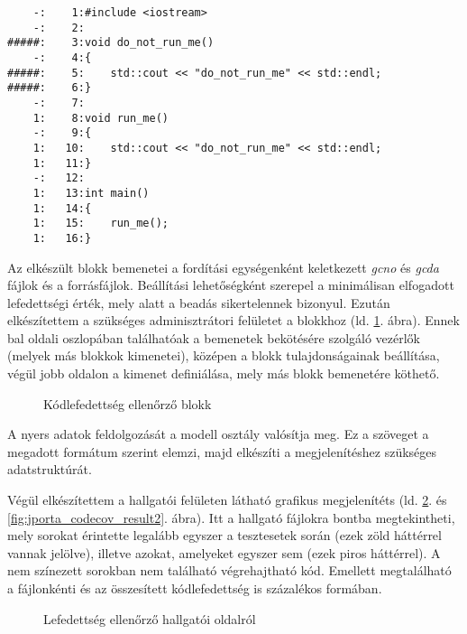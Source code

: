 \begin{lstlisting}
    -:    1:#include <iostream>
    -:    2:
#####:    3:void do_not_run_me()
    -:    4:{
#####:    5:    std::cout << "do_not_run_me" << std::endl;
#####:    6:}
    -:    7:
    1:    8:void run_me()
    -:    9:{	 
    1:   10:    std::cout << "do_not_run_me" << std::endl;
    1:   11:}
    -:   12:	 
    1:   13:int main()	 
    1:   14:{	 
    1:   15:    run_me();
    1:   16:}
\end{lstlisting}

Az elkészült blokk bemenetei a fordítási egységenként keletkezett \textit{gcno} és \textit{gcda} fájlok és a forrásfájlok. Beállítási lehetőségként szerepel a minimálisan elfogadott lefedettségi érték, mely alatt a beadás sikertelennek bizonyul. 
Ezután elkészítettem a szükséges adminisztrátori felületet a blokkhoz (ld. \ref{fig:jporta_codecov_block}. ábra). Ennek bal oldali oszlopában találhatóak a bemenetek bekötésére szolgáló vezérlők (melyek más blokkok kimenetei), középen a blokk tulajdonságainak beállítása, végül jobb oldalon a kimenet definiálása, mely más blokk bemenetére köthető.
    
\begin{figure}[h]
    \centering
    \caption{Kódlefedettség ellenőrző blokk}
    \label{fig:jporta_codecov_block}
\end{figure} 

A nyers adatok feldolgozását a modell osztály valósítja meg. Ez a szöveget a megadott formátum szerint elemzi, majd elkészíti a megjelenítéshez szükséges adatstruktúrát.

Végül elkészítettem a hallgatói felületen látható grafikus megjelenítéts (ld. \ref{fig:jporta_codecov_result1}. és \ref{fig:jporta_codecov_result2}. ábra). Itt a hallgató fájlokra bontba megtekintheti, mely sorokat érintette legalább egyszer a tesztesetek során (ezek zöld háttérrel vannak jelölve), illetve azokat, amelyeket egyszer sem (ezek piros háttérrel). A nem színezett sorokban nem található végrehajtható kód. Emellett megtalálható a fájlonkénti és az összesített kódlefedettség is százalékos formában.

\begin{figure}[h]
    \centering
    \caption{Lefedettség ellenőrző hallgatói oldalról}
    \label{fig:jporta_codecov_result1}
\end{figure} 

